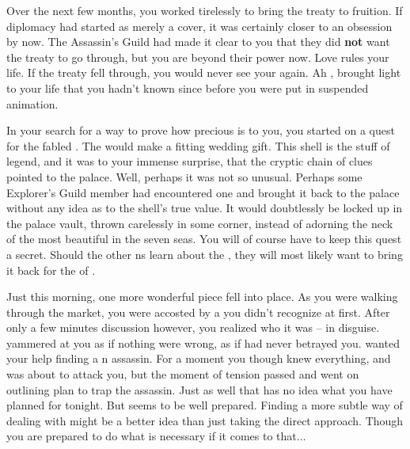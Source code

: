 \documentclass[char]{NeptuneBall}
\begin{document}
Over the next few months, you worked tirelessly to bring the treaty to fruition. If diplomacy had started as merely a cover, it was certainly closer to an obsession by now. The Assassin's Guild had made it clear to you that they did {\bf not} want the treaty to go through, but you are beyond their power now. Love rules your life. If the treaty fell through, you would never see your \cPrincess{} again. Ah \cPrincess{}, \cPrincess{\they} brought light to your life that you hadn't known since before you were put in suspended animation. 

In your search for a way to prove how precious \cPrincess{} is to you, you started on a quest for the fabled \iGlowShell{\MYname}. The \iGlowShell{\MYname} would make a fitting wedding gift. This shell is the stuff of legend, and it was to your immense surprise, that the cryptic chain of clues pointed to the \pAtlantis{} palace. Well, perhaps it was not so unusual. Perhaps some Explorer's Guild member had encountered one and brought it back to the palace without any idea as to the shell's true value. It would doubtlessly be locked up in the palace vault, thrown carelessly in some corner, instead of adorning the neck of the most beautiful \cPrincess{\mer} in the seven seas. You will of course have to keep this quest a secret. Should the other \pPacifica{}ns learn about the \iGlowShell{}, they will most likely want to bring it back for the \cPacificanRuler{\King} of \pPacifica{}.

Just this morning, one more wonderful piece fell into place. As you were walking through the market, you were accosted by a \cQueen{\mer} you didn't recognize at first. After only a few minutes discussion however, you realized who it was -- \cQueen{} in disguise. \cQueen{\They} yammered at you as if nothing were wrong, as if \cQueen{\they} had never betrayed you. \cQueen{} wanted your help finding a \pPacifica{}n assassin. For a moment you though \cQueen{\they} knew everything, and was about to attack you, but the moment of tension passed and \cQueen{\they} went on outlining \cQueen{\them} plan to trap the assassin. Just as well that \cQueen{\they} has no idea what you have planned for \cQueen{\them} tonight. But \cQueen{\they} seems to be well prepared. Finding a more subtle way of dealing with \cQueen{\them} might be a better idea than just taking the direct approach. Though you are prepared to do what is necessary if it comes to that...
\end{document}
